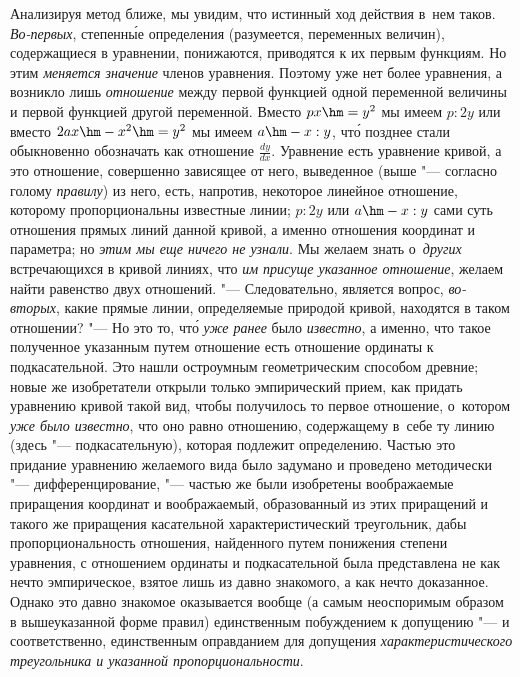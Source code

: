 Анализируя метод ближе, мы увидим, что истинный ход действия в~нем таков.
{\em Во-первых}, степенн\'{ы}е определения (разумеется, переменных величин),
содержащиеся в уравнении, понижаются, приводятся к их первым функциям. Но этим
{\em меняется значение} членов уравнения. Поэтому уже нет более уравнения,
а возникло лишь {\em отношение} между первой функцией одной переменной величины
и первой функцией другой переменной. Вместо $px\hm=y^2$ мы имеем $p:2y$ или
вместо $2ax\hm-x^2\hm=y^2$ мы имеем $a\hm-x:y$, чт\'{о} позднее стали
обыкновенно обозначать как отношение $\frac{dy}{dx}$. Уравнение есть уравнение
кривой, а это отношение, совершенно зависящее от него, выведенное (выше "---
согласно голому {\em правилу}) из него, есть, напротив, некоторое линейное
отношение, которому пропорциональны известные линии; $p:2y$ или $a\hm-x:y$ сами
суть отношения прямых линий данной кривой, а именно отношения координат и
параметра; но {\em этим мы еще ничего не узнали}. Мы желаем знать
о~{\em других} встречающихся в кривой линиях, что {\em им присуще указанное
отношение}, желаем найти равенство двух отношений. "--- Следовательно, является
вопрос, {\em во-вторых}, какие прямые линии, определяемые природой кривой,
находятся в таком отношении? "--- Но это то, чт\'{о} {\em уже ранее} было
{\em известно}, а именно, что такое полученное указанным путем отношение есть
отношение ординаты к подкасательной. Это нашли остроумным геометрическим
способом древние; новые же изобретатели открыли только эмпирический прием, как
придать уравнению кривой такой вид, чтобы получилось то первое отношение,
о~котором {\em уже было известно}, что оно равно отношению, содержащему в~себе
ту линию (здесь "--- подкасательную), которая подлежит определению. Частью это
придание уравнению желаемого вида было задумано и проведено методически
"--- дифференцирование, "--- частью же были изобретены воображаемые
приращения координат и воображаемый, образованный из этих приращений и
такого же приращения касательной характеристический треугольник, дабы
пропорциональность отношения, найденного путем понижения степени уравнения,
с отношением ординаты и подкасательной была представлена не как нечто
эмпирическое, взятое лишь из давно знакомого, а как нечто доказанное.
Однако это давно знакомое оказывается вообще (а самым неоспоримым образом в
вышеуказанной форме правил) единственным побуждением к допущению "--- и
соответственно, единственным оправданием для допущения
{\em характеристического треугольника и указанной пропорциональности}.

